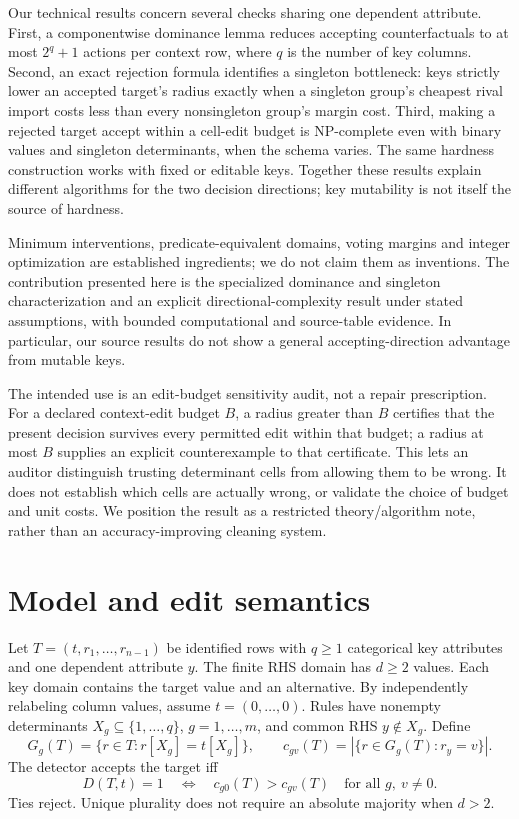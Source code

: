 \documentclass[11pt]{article}
\begin{document}
Our technical results concern several checks sharing one dependent attribute.
First, a componentwise dominance lemma reduces accepting counterfactuals to
at most $2^q+1$ actions per context row, where $q$ is the number of key columns.
Second, an exact rejection formula identifies a singleton bottleneck: keys
strictly lower an accepted target's radius exactly when a singleton group's
cheapest rival import costs less than every nonsingleton group's margin cost.
Third, making a rejected target accept within a cell-edit budget is
NP-complete even with binary values and singleton determinants, when the
schema varies. The same hardness construction works with fixed or editable
keys. Together these results explain different algorithms for the two
decision directions; key mutability is not itself the source of hardness.

Minimum interventions, predicate-equivalent domains, voting margins and integer
optimization are established ingredients; we do not claim them as inventions.
The contribution presented here is the specialized dominance and singleton
characterization and an explicit directional-complexity result under stated
assumptions, with bounded computational and source-table evidence.
In particular, our source results do not show a general
accepting-direction advantage from mutable keys.


The intended use is an edit-budget sensitivity audit, not a repair prescription.
For a declared context-edit budget $B$, a radius greater than $B$ certifies that
the present decision survives every permitted edit within that budget; a radius
at most $B$ supplies an explicit counterexample to that certificate. This lets
an auditor distinguish trusting determinant cells from allowing them to be
wrong. It does not establish which cells are actually wrong, or validate the
choice of budget and unit costs. We position the result as a restricted
theory/algorithm note, rather than an accuracy-improving cleaning system.

\section{Model and edit semantics}
Let $T=(t,r_1,\ldots,r_{n-1})$ be identified rows with $q\geq1$ categorical key
attributes and one dependent attribute $y$. The finite RHS domain has
$d\geq2$ values. Each key domain contains the target value and an alternative.
By independently relabeling column values, assume $t=(0,\ldots,0)$.
Rules have nonempty determinants $X_g\subseteq\{1,\ldots,q\}$, $g=1,\ldots,m$,
and common RHS $y\notin X_g$. Define
\[
 G_g(T)=\{r\in T:r[X_g]=t[X_g]\},\qquad
 c_{gv}(T)=|\{r\in G_g(T):r_y=v\}|.
\]
The detector accepts the target iff
\begin{equation}\label{eq:accept}
 D(T,t)=1\quad\Longleftrightarrow\quad
 c_{g0}(T)>c_{gv}(T)\quad\text{for all }g,\ v\ne0.
\end{equation}
Ties reject. Unique plurality does not require an absolute majority when $d>2$.
\end{document}
